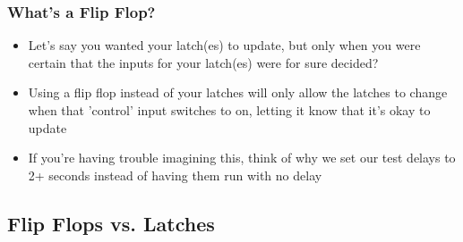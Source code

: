 \documentclass{beamer}
\begin{document}
   		\begin{frame}
   			\frametitle{What's a Flip Flop?}
   			\begin{itemize}
   				\item Let's say you wanted your latch(es) to update, but only when you were certain that the inputs for your latch(es) were for sure decided?
   				\item Using a flip flop instead of your latches will only allow the latches to change when that 'control' input switches to on, letting it know that it's okay to update
   				\item If you're having trouble imagining this, think of why we set our test delays to 2+ seconds instead of having them run with no delay
   			\end{itemize}
   		\end{frame}
   		
   		\subsection{Flip Flops vs. Latches}
   		
\end{document}
